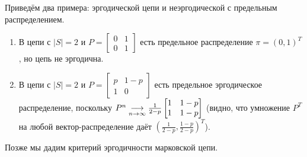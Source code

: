 \begin{example}
    \label{example:markov:has_limit_but_not_ergodic}
    Приведём два примера: эргодической цепи и неэргодической с предельным распределением.
    \begin{enumerate}
        \item
            В цепи с $ |S| = 2 $ и $ P = \begin{bmatrix} 0 & 1 \\ 0 & 1 \end{bmatrix} $
            есть предельное распределение $ \pi = (0, 1)^T $, но цепь не эргодична.
        \item
            В цепи с $ |S| = 2 $ и $ P = \begin{bmatrix} p & 1 - p \\ 1 & 0 \end{bmatrix} $
            есть предельное эргодическое распределение, поскольку
            $ P^n \underset{n \to \infty}{\longrightarrow} \frac{1}{2 - p} \begin{bmatrix} 1 & 1 - p \\ 1 & 1 - p \end{bmatrix} $
            (видно, что умножение $ P^T $ на любой вектор-распределение даёт $ \left( \frac{1}{2 - p}, \frac{1 - p}{2 - p} \right)^T $).
    \end{enumerate}
\end{example}

Позже мы дадим критерий эргодичности марковской цепи.
